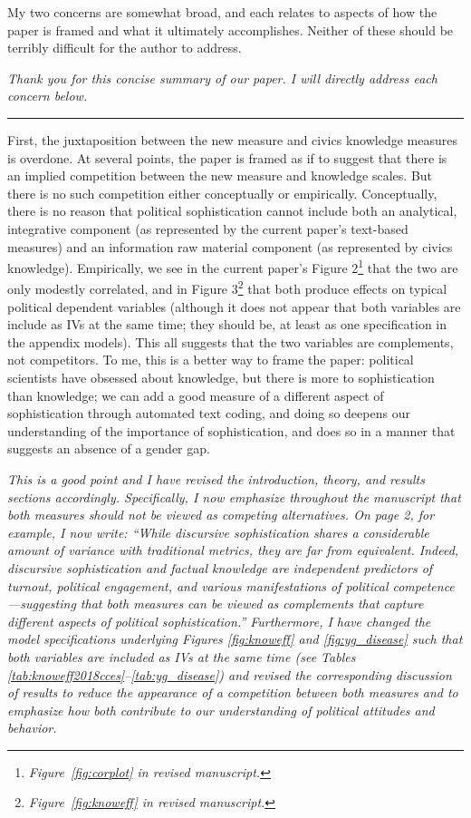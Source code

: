 My two concerns are somewhat broad, and each relates to aspects of how the paper is framed and what it ultimately accomplishes. Neither of these should be terribly difficult for the author to address.

\textit{Thank you for this concise summary of our paper. I will directly address each concern below.}


\rule{\linewidth}{.01cm}

First, the juxtaposition between the new measure and civics knowledge measures is overdone. At several points, the paper is framed as if to suggest that there is an implied competition between the new measure and knowledge scales. But there is no such competition either conceptually or empirically. Conceptually, there is no reason that political sophistication cannot include both an analytical, integrative component (as represented by the current paper's text-based measures) and an information raw material component (as represented by civics knowledge). Empirically, we see in the current paper's Figure 2\footnote{\textit{Figure~\ref{fig:corplot} in revised manuscript.}} that the two are only modestly correlated, and in Figure 3\footnote{\textit{Figure~\ref{fig:knoweff} in revised manuscript.}} that both produce effects on typical political dependent variables (although it does not appear that both variables are include as IVs at the same time; they should be, at least as one specification in the appendix models). This all suggests that the two variables are complements, not competitors. To me, this is a better way to frame the paper: political scientists have obsessed about knowledge, but there is more to sophistication than knowledge; we can add a good measure of a different aspect of sophistication through automated text coding, and doing so deepens our understanding of the importance of sophistication, and does so in a manner that suggests an absence of a gender gap. 

\textit{This is a good point and I have revised the introduction, theory, and results sections accordingly. Specifically, I now emphasize throughout the manuscript that both measures should not be viewed as competing alternatives. On page 2, for example, I now write: ``While discursive sophistication shares a considerable amount of variance with traditional metrics, they are far from equivalent. Indeed, discursive sophistication and factual knowledge are independent predictors of turnout, political engagement, and various manifestations of political competence---suggesting that both measures can be viewed as complements that capture different aspects of political sophistication.'' Furthermore, I have changed the model specifications underlying Figures \ref{fig:knoweff} and \ref{fig:yg_disease} such that both variables are included as IVs at the same time (see Tables \ref{tab:knoweff2018cces}--\ref{tab:yg_disease}) and revised the corresponding discussion of results to reduce the appearance of a competition between both measures and to emphasize how both contribute to our understanding of political attitudes and behavior.}

